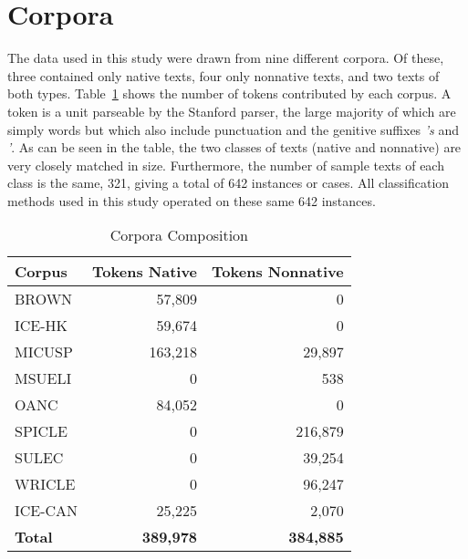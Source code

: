 \documentclass[main.tex]{subfiles}
\begin{document}
\section{Corpora}
\setcounter{section}{3}

The data used in this study were drawn from nine different corpora. Of these, three contained only native texts, four only nonnative texts, and two texts of both types. Table~\ref{table:corpora} shows the number of tokens contributed by each corpus. A token is a unit parseable by the Stanford parser, the large majority of which are simply words but which also include punctuation and the genitive suffixes \textit{'s} and \textit{'}. As can be seen in the table, the two classes of texts (native and nonnative) are very closely matched in size. Furthermore, the number of sample texts of each class is the same, 321, giving a total of 642 instances or cases. All classification methods used in this study operated on these same 642 instances.

\begin{table}[htbp]
\small
\centering
\caption{Corpora Composition}
  \begin{tabular}{  l  r  r }
  \toprule
    Corpus & Tokens Native & Tokens Nonnative \\ \midrule
    BROWN & 57,809 & 0 \\
    ICE-HK & 59,674 & 0 \\
    MICUSP & 163,218  & 29,897 \\
    MSUELI & 0 & 538 \\
    OANC & 84,052 & 0 \\
    SPICLE & 0 & 216,879 \\
    SULEC & 0 & 39,254 \\
    WRICLE & 0 & 96,247  \\
    ICE-CAN & 25,225 & 2,070 \\
    \textbf{Total} & \textbf{389,978} & \textbf{384,885}  \\
    \bottomrule
  \end{tabular}
\label{table:corpora}
\end{table}
\end{document}
